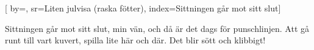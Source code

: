 
[ 		%
	by={},					%
	sr={Liten julvisa (raska fötter)},					%
	index={Sittningen går mot sitt slut}]						%
	
\beginverse*						%
Sittningen går mot sitt slut, min vän, 
och då är det dags för punschlinjen. 
Att gå runt till vart kuvert, 
spilla lite här och där. 
Det blir sött och klibbigt!
\endverse							%

\vspace{5mm}
\endsong							%